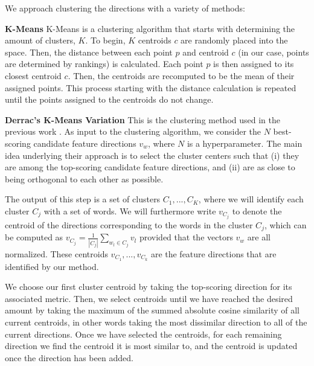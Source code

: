 We approach clustering the directions with a variety of methods:

\noindent \textbf{K-Means} K-Means is a clustering algorithm that starts with determining the amount of clusters, $K$. To begin, $K$ centroids $c$ are randomly placed into the space. Then, the distance between each point $p$ and centroid $c$ (in our case, points are determined by rankings) is calculated. Each point $p$ is then assigned to its closest centroid $c$. Then, the centroids are recomputed to be the mean of their assigned points. This process starting with the distance calculation is repeated until the points assigned to the centroids do not change. 

\noindent \textbf{Derrac's K-Means Variation} This is the clustering method used in the previous work \cite{derracAIJ}. As input to the clustering algorithm, we consider the $N$ best-scoring candidate feature directions $v_w$, where $N$ is a hyperparameter. The main idea underlying their approach is to select the cluster centers such that (i) they are among the top-scoring candidate feature directions, and (ii) are as close to being orthogonal to each other as possible. 
 
The output of this step is a set of clusters $C_1,...,C_K$, where we will identify each cluster $C_j$ with a set of words.
We will furthermore write $v_{C_j}$ to denote the centroid of the directions corresponding to the words in the cluster $C_j$, which can be computed as $v_{C_j}= \frac{1}{|C_j|} \sum_{w_l\in C_j} v_l$ provided that the vectors $v_w$ are all normalized. These centroids $v_{C_1},...,v_{C_k}$ are the feature directions that are identified by our method. 

We choose our first cluster centroid by taking the top-scoring direction for its associated metric. Then, we select centroids until we have reached the desired amount by taking the maximum of the summed absolute cosine similarity of all current centroids, in other words taking the most dissimilar direction to all of the current directions. Once we have selected the centroids, for each remaining direction we find the centroid it is most similar to, and the centroid is updated once the direction has been added. 


